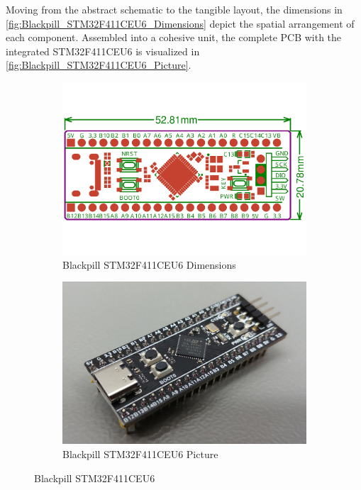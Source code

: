 Moving from the abstract schematic to the tangible layout, the dimensions in \autoref{fig:Blackpill_STM32F411CEU6_Dimensions} depict the spatial arrangement of each component. Assembled into a cohesive unit, the complete PCB with the integrated STM32F411CEU6 is visualized in \autoref{fig:Blackpill_STM32F411CEU6_Picture}.
\begin{figure}[H]
    \centering
    \begin{subfigure}{0.48\textwidth}
        \includegraphics[width=\linewidth]{img/blackpill/original-dimensions-STM32F411CEU6_WeAct_Black_Pill_V2.0.pdf}
        \caption{Blackpill STM32F411CEU6 Dimensions}
        \label{fig:Blackpill_STM32F411CEU6_Dimensions}
    \end{subfigure}
    \hfill
    \begin{subfigure}{0.48\textwidth}
        \includegraphics[width=\linewidth]{img/blackpill/STM32F411CEU6_WeAct_Black_Pill_V2.0-1.jpg}
    \caption{Blackpill STM32F411CEU6 Picture}
    \label{fig:Blackpill_STM32F411CEU6_Picture}
    \end{subfigure}
      \caption{Blackpill STM32F411CEU6}
  \label{fig:Blackpill STM32F411CEU6}
\end{figure}
